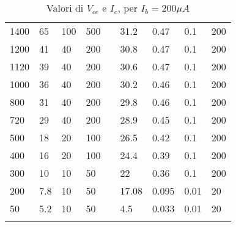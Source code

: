 \begin{longtable}[c]{|l|l|l|l|l|l|l|l|l|}
    1400          & 65                        & 100                       & 500                       &  & 31.2       & 0.47                      & 0.1                       & 200                       \\ \cline{1-4} \cline{6-9}
    1200          & 41                        & 40                        & 200                       &  & 30.8       & 0.47                      & 0.1                       & 200                       \\ \cline{1-4} \cline{6-9}
    1120          & 39                        & 40                        & 200                       &  & 30.6       & 0.47                      & 0.1                       & 200                       \\ \cline{1-4} \cline{6-9}
    1000          & 36                        & 40                        & 200                       &  & 30.2       & 0.46                      & 0.1                       & 200                       \\ \cline{1-4} \cline{6-9}
    800           & 31                        & 40                        & 200                       &  & 29.8       & 0.46                      & 0.1                       & 200                       \\ \cline{1-4} \cline{6-9}
    720           & 29                        & 40                        & 200                       &  & 28.9       & 0.45                      & 0.1                       & 200                       \\ \cline{1-4} \cline{6-9}
    500           & 18                        & 20                        & 100                       &  & 26.5       & 0.42                      & 0.1                       & 200                       \\ \cline{1-4} \cline{6-9}
    400           & 16                        & 20                        & 100                       &  & 24.4       & 0.39                      & 0.1                       & 200                       \\ \cline{1-4} \cline{6-9}
    300           & 10                        & 10                        & 50                        &  & 22         & 0.36                      & 0.1                       & 200                       \\ \cline{1-4} \cline{6-9}
    200           & 7.8                       & 10                        & 50                        &  & 17.08      & 0.095                     & 0.01                      & 20                        \\ \cline{1-4} \cline{6-9}
    50            & 5.2                       & 10                        & 50                        &  & 4.5        & 0.033                    & 0.01                      & 20                        \\ \cline{1-4} \cline{6-9}
    \caption{\label{tab:Tabella1}{Valori di $V_{ce}$ e $I_c$, per $I_b=200\mu A$}}                                                                                                                        \\
\end{longtable}

